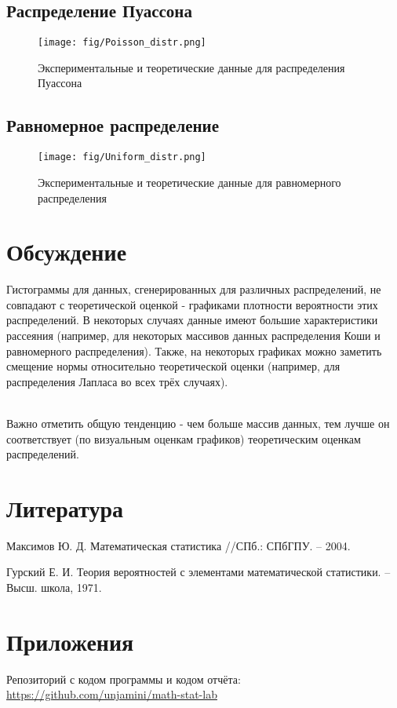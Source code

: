 \subsection{Распределение Пуассона}
\begin{figure}[H]
	\begin{center}
		\texttt{[image: fig/Poisson\_distr.png]}
		\caption{Экспериментальные и теоретические данные для распределения Пуассона} 
		\label{pic:pic_name} %
	\end{center}
\end{figure}

\subsection{Равномерное распределение}


\begin{figure}[H]
	\begin{center}
		\texttt{[image: fig/Uniform\_distr.png]}
		\caption{Экспериментальные и теоретические данные для равномерного распределения} 
		\label{pic:pic_name}
	\end{center}
\end{figure}


\section{Обсуждение}
Гистограммы для данных, сгенерированных для различных распределений, не совпадают с теоретической оценкой - графиками плотности вероятности этих распределений. В некоторых случаях данные имеют большие характеристики рассеяния (например, для некоторых массивов данных распределения Коши и равномерного распределения). Также, на некоторых графиках можно заметить смещение нормы относительно теоретической оценки (например, для распределения Лапласа во всех трёх случаях). 

\\

Важно отметить общую тенденцию - чем больше массив данных, тем лучше он соответствует (по визуальным оценкам графиков) теоретическим оценкам распределений.




\section{Литература}
Максимов Ю. Д. Математическая статистика //СПб.: СПбГПУ. – 2004.

Гурский Е. И. Теория вероятностей с элементами математической статистики. – Высш. школа, 1971.

\section{Приложения}

Репозиторий с кодом программы и кодом отчёта: \href{https://github.com/unjamini/math-stat-lab}{https://github.com/unjamini/math-stat-lab}



